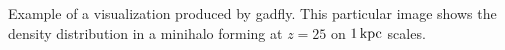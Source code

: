 \label{fig:vis}
Example of a visualization produced by gadfly.  This particular image shows the density distribution in a minihalo forming at $z=25$ on $1\,{\rm kpc}$ scales.